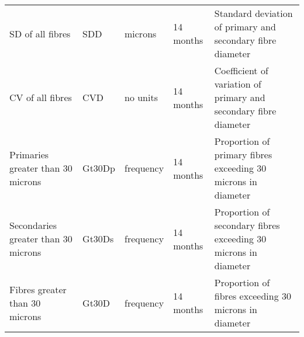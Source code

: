 \begin{center}
\begin{landscape}
\begin{longtable}{p{1.5in}|p{0.8in}|p{1.5in}|p{1.0in}|p{2.5in}}
  SD of all fibres & SDD & microns & 14 months & Standard deviation of primary and secondary fibre diameter \\
  CV of all fibres & CVD & no units & 14 months & Coefficient of variation of primary and secondary fibre diameter \\
  Primaries greater than 30 microns & Gt30Dp & frequency & 14 months & Proportion of primary fibres exceeding 30 microns in diameter \\
  Secondaries greater than 30 microns & Gt30Ds & frequency & 14 months & Proportion of secondary fibres exceeding 30 microns in diameter \\
  Fibres greater than 30 microns & Gt30D & frequency & 14 months & Proportion of fibres exceeding 30 microns in diameter \\

\end{longtable}
\end{landscape}
\end{center}
%
